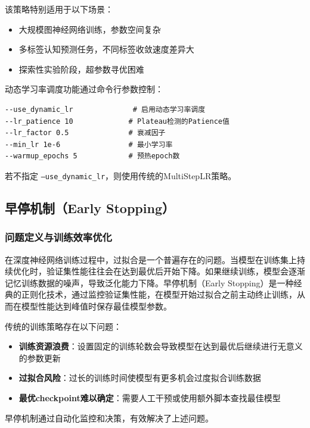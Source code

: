 该策略特别适用于以下场景：
\begin{itemize}
    \item 大规模图神经网络训练，参数空间复杂
    \item 多标签认知预测任务，不同标签收敛速度差异大
    \item 探索性实验阶段，超参数寻优困难
\end{itemize}


动态学习率调度功能通过命令行参数控制：

\begin{verbatim}
--use_dynamic_lr              # 启用动态学习率调度
--lr_patience 10             # Plateau检测的Patience值
--lr_factor 0.5              # 衰减因子
--min_lr 1e-6                # 最小学习率
--warmup_epochs 5            # 预热epoch数
\end{verbatim}

若不指定 \texttt{--use\_dynamic\_lr}，则使用传统的MultiStepLR策略。

\subsection{早停机制（Early Stopping）}

\subsubsection{问题定义与训练效率优化}

在深度神经网络训练过程中，过拟合是一个普遍存在的问题。当模型在训练集上持续优化时，验证集性能往往会在达到最优后开始下降。如果继续训练，模型会逐渐记忆训练数据的噪声，导致泛化能力下降。早停机制（Early Stopping）是一种经典的正则化技术，通过监控验证集性能，在模型开始过拟合之前主动终止训练，从而在模型性能达到峰值时保存最佳模型参数。

传统的训练策略存在以下问题：

\begin{itemize}
    \item \textbf{训练资源浪费}：设置固定的训练轮数会导致模型在达到最优后继续进行无意义的参数更新
    \item \textbf{过拟合风险}：过长的训练时间使模型有更多机会过度拟合训练数据
    \item \textbf{最优checkpoint难以确定}：需要人工干预或使用额外脚本查找最佳模型
\end{itemize}

早停机制通过自动化监控和决策，有效解决了上述问题。


